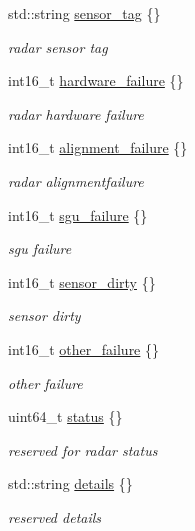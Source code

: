 \begin{DoxyCompactItemize}
\item 
std\+::string \hyperlink{structmaf__perception__interface_1_1BoschRadarSensorStatus_ae9a37619aaca42314816ff28934cb69c}{sensor\+\_\+tag} \{\}
\begin{DoxyCompactList}\small\item\em radar sensor tag \end{DoxyCompactList}\item 
int16\+\_\+t \hyperlink{structmaf__perception__interface_1_1BoschRadarSensorStatus_add738daa052845f771057e5abf88e948}{hardware\+\_\+failure} \{\}
\begin{DoxyCompactList}\small\item\em radar hardware failure \end{DoxyCompactList}\item 
int16\+\_\+t \hyperlink{structmaf__perception__interface_1_1BoschRadarSensorStatus_a17ed57d3149b407ad98ffef2d7d2f770}{alignment\+\_\+failure} \{\}
\begin{DoxyCompactList}\small\item\em radar alignmentfailure \end{DoxyCompactList}\item 
int16\+\_\+t \hyperlink{structmaf__perception__interface_1_1BoschRadarSensorStatus_acd39c2133c7b2017ad84e8d64f960bb7}{sgu\+\_\+failure} \{\}
\begin{DoxyCompactList}\small\item\em sgu failure \end{DoxyCompactList}\item 
int16\+\_\+t \hyperlink{structmaf__perception__interface_1_1BoschRadarSensorStatus_a4ea868df17dd128b81d9036c23b94d10}{sensor\+\_\+dirty} \{\}
\begin{DoxyCompactList}\small\item\em sensor dirty \end{DoxyCompactList}\item 
int16\+\_\+t \hyperlink{structmaf__perception__interface_1_1BoschRadarSensorStatus_aa6f148f0c7bfca00eab7b4682a354b2c}{other\+\_\+failure} \{\}
\begin{DoxyCompactList}\small\item\em other failure \end{DoxyCompactList}\item 
uint64\+\_\+t \hyperlink{structmaf__perception__interface_1_1BoschRadarSensorStatus_a382e31f8ffce189a988ddf34586591b1}{status} \{\}
\begin{DoxyCompactList}\small\item\em reserved for radar status \end{DoxyCompactList}\item 
std\+::string \hyperlink{structmaf__perception__interface_1_1BoschRadarSensorStatus_a91f3bf946e43404c54b6cb8d4c026e45}{details} \{\}
\begin{DoxyCompactList}\small\item\em reserved details \end{DoxyCompactList}\end{DoxyCompactItemize}


